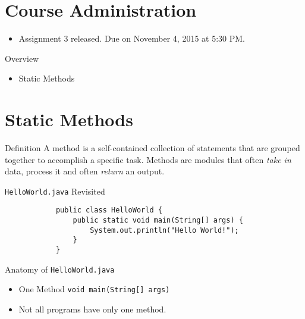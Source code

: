 \documentclass[10pt, compress]{beamer}
\begin{document}
\prepareCover

\section{Course Administration}

\begin{slide}
	\begin{itemize}
		\item[] Assignment 3 released. Due on November 4, 2015 at 5:30 PM.
	\end{itemize}
\end{slide}

\begin{slide}
	\begin{block}{Overview}
		\begin{itemize}
			\item[] Static Methods
		\end{itemize}
	\end{block}
\end{slide}

\section{Static Methods}

\begin{slide}
	\begin{block}{Definition}
		A method is a self-contained collection of statements that are grouped together to accomplish a specific task.
		Methods are modules that often \textit{take in} data, process it and often \textit{return} an output.
	\end{block}
\end{slide}

\begin{slide}
	\begin{block}{\texttt{HelloWorld.java} Revisited}
		\begin{verbatim}
			public class HelloWorld {
			    public static void main(String[] args) {
			        System.out.println("Hello World!");
			    }
			}
		\end{verbatim}
	\end{block}
	\begin{block}{Anatomy of \texttt{HelloWorld.java}}
		\begin{itemize}
			\item[] One Method \texttt{void main(String[] args)}
			\item[] Not all programs have only one method.
		\end{itemize}
	\end{block}
\end{slide}
\end{document}

